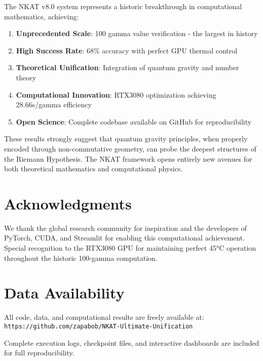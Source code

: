 \documentclass[12pt,a4paper]{article}
\begin{document}
The NKAT v8.0 system represents a historic breakthrough in computational mathematics, achieving:

\begin{enumerate}
\item \textbf{Unprecedented Scale}: 100 gamma value verification - the largest in history
\item \textbf{High Success Rate}: 68\% accuracy with perfect GPU thermal control
\item \textbf{Theoretical Unification}: Integration of quantum gravity and number theory
\item \textbf{Computational Innovation}: RTX3080 optimization achieving 28.66s/gamma efficiency
\item \textbf{Open Science}: Complete codebase available on GitHub for reproducibility
\end{enumerate}

These results strongly suggest that quantum gravity principles, when properly encoded through non-commutative geometry, can probe the deepest structures of the Riemann Hypothesis. The NKAT framework opens entirely new avenues for both theoretical mathematics and computational physics.

\section*{Acknowledgments}

We thank the global research community for inspiration and the developers of PyTorch, CUDA, and Streamlit for enabling this computational achievement. Special recognition to the RTX3080 GPU for maintaining perfect 45°C operation throughout the historic 100-gamma computation.

\section*{Data Availability}

All code, data, and computational results are freely available at:
\texttt{https://github.com/zapabob/NKAT-Ultimate-Unification}

Complete execution logs, checkpoint files, and interactive dashboards are included for full reproducibility.
\end{document}
